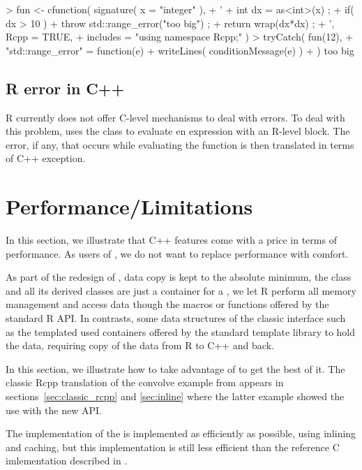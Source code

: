\begin{example}
> fun <- cfunction( signature( x = "integer" ), 
+ ' 
+   int dx = as<int>(x) ;
+   if( dx > 10 ) 
+      throw std::range_error("too big") ;
+   return wrap(dx*dx) ;
+ ', Rcpp = TRUE, 
+  includes = "using namespace Rcpp;" )
> tryCatch( fun(12), 
+ "std::range_error" = function(e){
+    writeLines( conditionMessage(e) )
+ } )
too big
\end{example}

\subsection{R error in C++}

R currently does not offer C-level mechanisms to deal with errors. To 
deal with this problem,  uses the 
class to evaluate en expression with an R-level 
block. The error, if any, that occurs while evaluating the 
function is then translated in terms of C++ exception. 


\section{Performance/Limitations}

In this section, we illustrate that C++ features come with a price
in terms of performance. As users of , we do not want
to replace performance with comfort. 

As part of the redesign of , data copy is kept to the
absolute minimum, the  class and all its derived
classes are just a container for a , we let R perform
all memory management and access data though the macros or functions
offered by the standard R API. In contrasts, some data structures
of the classic  interface such as the templated 
 used containers offered by the standard template
library to hold the data, requiring copy of the data 
from R to C++ and back.

In this section, we illustrate how to take advantage of  to get
the best of it. The classic Rcpp translation of the convolve example from
\cite{R:exts} appears in sections~\ref{sec:classic_rcpp} and
\ref{sec:inline} where the latter example showed the use with the new API.

The implementation of the  is implemented as 
efficiently as possible, using inlining and caching, 
but this implementation is still less efficient than the 
reference C imlementation described in \cite{R:exts}.

